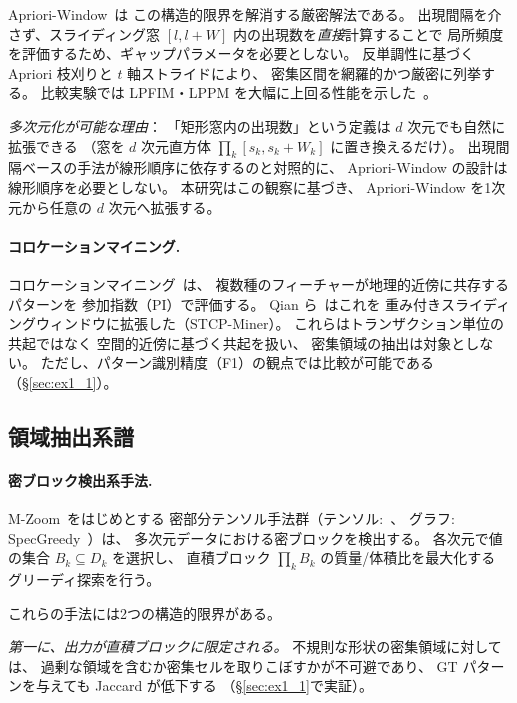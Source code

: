 Apriori-Window~\cite{aprioriwindow}は
この構造的限界を解消する厳密解法である。
出現間隔を介さず、スライディング窓 $[l, l+W]$ 内の出現数を\emph{直接}計算することで
局所頻度を評価するため、ギャップパラメータを必要としない。
反単調性に基づく Apriori 枝刈りと $t$ 軸ストライドにより、
密集区間を網羅的かつ厳密に列挙する。
比較実験では LPFIM・LPPM を大幅に上回る性能を示した~\cite{aprioriwindow}。

\emph{多次元化が可能な理由}：
「矩形窓内の出現数」という定義は $d$ 次元でも自然に拡張できる
（窓を $d$ 次元直方体 $\prod_k [s_k, s_k+W_k]$ に置き換えるだけ）。
出現間隔ベースの手法が線形順序に依存するのと対照的に、
Apriori-Window の設計は線形順序を必要としない。
本研究はこの観察に基づき、
Apriori-Window を1次元から任意の $d$ 次元へ拡張する。

\paragraph{コロケーションマイニング.}
コロケーションマイニング~\cite{shekhar2001colocation}は、
複数種のフィーチャーが地理的近傍に共存するパターンを
参加指数（PI）で評価する。
Qian ら~\cite{qian2009stcolocation}はこれを
重み付きスライディングウィンドウに拡張した（STCP-Miner）。
これらはトランザクション単位の共起ではなく
空間的近傍に基づく共起を扱い、
密集領域の抽出は対象としない。
ただし、パターン識別精度（F1）の観点では比較が可能である（\S\ref{sec:ex1_1}）。

\subsection{領域抽出系譜}

\paragraph{密ブロック検出系手法.}
M-Zoom~\cite{shin2018mzoom}をはじめとする
密部分テンソル手法群（テンソル:~\cite{jiang2015crossspot,shin2018mbiz,shin2017dcube,shin2017densealert,shin2023catchcore}、
グラフ: SpecGreedy~\cite{feng2020specgreedy}）は、
多次元データにおける密ブロックを検出する。
各次元で値の集合 $B_k \subseteq D_k$ を選択し、
直積ブロック $\prod_k B_k$ の質量/体積比を最大化する
グリーディ探索を行う。

これらの手法には2つの構造的限界がある。

\emph{第一に、出力が直積ブロックに限定される。}
不規則な形状の密集領域に対しては、
過剰な領域を含むか密集セルを取りこぼすかが不可避であり、
GT パターンを与えても Jaccard が低下する
（\S\ref{sec:ex1_1}で実証）。

